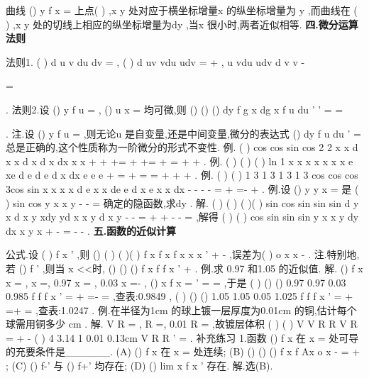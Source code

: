 曲线
()
y
f x
=
上点(
)
,x y 处对应于横坐标增量x
\Delta 的纵坐标增量为
y
\Delta ,而曲线在 
(
)
,x y 处的切线上相应的纵坐标增量为dy ,当x
\Delta 很小时,两者近似相等. 
\vspace{4pt}
{\bfseries \textcolor{lyred}{四.微分运算法则}}

\textcolor{lyred}{法则1}. (
)
d
u
v
du
dv
\alpha 
\beta 
\alpha 
\beta 
\pm 
=
\pm 
, (
)
d uv
vdu
udv
=
+
,
u
vdu
udv
d
v
v
-

=




.\textcolor{lyred}{ }
\textcolor{lyred}{法则2}.设
()
y
f u
=
,
()
u
x
\varphi 
=
均可微,则
()
()
()
dy
f
g x
dg x
f
u du
'
'
=
=




.\textcolor{lyred}{ }
\textcolor{lyred}{注}.设
()
y
f u
=
,则无论u 是自变量,还是中间变量,微分的表达式
()
dy
f
u du
'
=
总是正确的,这个性质称为\textcolor{lyred}{一阶微分的形式不变性}. 
\textcolor{lyred}{例}.
(
)
cos
cos
sin
cos
2 2
x
x
d
x
x
d
x
d
x
dx
x
x
+
+
+=
+
+=
+
=
+
+
. 
\textcolor{lyred}{例}.
(
)
(
)
(
)
ln 1
x
x
x
x
x
x
x
e
xe
d
e
d
e
d x
dx
e
e
e
+
=
+
=
=
+
+
+
. 
\textcolor{lyred}{例}. (
)
(
)
1 3
1 3
1 3
1 3
cos
cos
cos
3cos
sin
x
x
x
x
d e
x
x de
e
d
x
e
x
x dx
-
-
-
-
=
\cdots 
+
\cdots 
=-
+
. 
\textcolor{lyred}{例}.设
()
y
y x
=
是
(
)
sin
cos
y
x
x
y
-
-
=
确定的隐函数,求dy . 
解. (
)
(
)
(
)(
)
sin
cos
sin
sin
sin
d y
x
d
x
y
xdy
yd
x
x
y d x
y
-
-
=
\Rightarrow 
+
+
-
-
=
,解得 
(
)
(
)
cos
sin
sin
sin
y
x
x
y
dy
dx
x
y
x
+
-
=
-
-
. 
\vspace{4pt}
{\bfseries \textcolor{lyred}{五.函数的近似计算}}

\textcolor{lyred}{公式}.设
(
)
f
x
'
\neq 
,则
()
(
)
(
)(
)
f x
f x
f
x
x
x
'
\approx 
+
-
,误差为(
)
o x
x
-
. 
\textcolor{lyred}{注}.特别地,若
()
f '
\neq 
,则当
x <<时,
()
()
()
f x
f
f
x
'
\approx 
+
. 
\textcolor{lyred}{例}.求
0.97 和1.05 的近似值. 
解.
()
f x
x
=
,
x =,
0.97
x =
,
0.03
x
\Delta =-
,
()
x
f
x
=
'
=
=
,于是 
(
)
()
()
0.97
0.97
0.03
0.985
f
f
f
x
\Delta 
'
=
\approx 
+
=-
\cdots 
=
,查表:0.9849 , 
(
)
()
()
1.05
1.05
0.05
1.025
f
f
f
x
'
=
\approx 
+
\Delta =+
\cdots 
=
,查表:1.0247 . 
\textcolor{lyred}{例}.在半径为1cm 的球上镀一层厚度为0.01cm 的铜,估计每个球需用铜多少
cm . 
解.
V
R
\pi 
=
,
R =,
0.01
R
\Delta 
=
,故镀层体积
(
)
(
)
V
V R
R
V R
\Delta 
=
+\Delta 
-
\approx  
(
)
4 3.14 1 0.01
0.13cm
V
R
R
'
\Delta 
=
\cdots 
\cdots 
\cdots 
\approx 
. 
\textcolor{lyred}{补充练习 }
1.函数
()
f x 在
x =
处可导的充要条件是______. 
(A)
()
f x 在
x =
处连续;        (B)
()
()
()
f x
f
Ax
o x
-
=
+
; 
(C)
()
f-'
与
()
f+'
均存在;       (D)
()
lim
x
f
x
\to 
'
存在. 
解.选(B). 